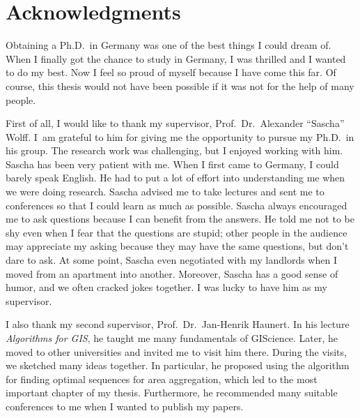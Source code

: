 \section{Acknowledgments}

Obtaining a Ph.D.\ in Germany was 
one of the best things I could dream of.
When I finally got the chance to study in Germany,
I was thrilled and I wanted to do my best.
Now I feel so proud of myself because I have come this far.
Of course, this thesis would not have been possible
if it was not for the help of many people.

First of all, I would like to thank my supervisor, 
Prof.\ Dr.\ Alexander ``Sascha'' Wolff.
I~am grateful to him for giving me 
the opportunity to pursue my Ph.D.\ in his group.
The research work was challenging,
but I enjoyed working with him.
Sascha has been very patient with me.
When I first came to Germany, I could barely speak English.
He had to put a lot of effort into understanding me
when we were doing research.
Sascha advised me to take lectures and sent me to conferences
so that I could learn as much as possible.
Sascha always encouraged me to ask questions
because I can benefit from the answers.
He told me not to be shy even when 
I fear that the questions are stupid;
other people in the audience may appreciate my asking
because they may have the same questions,
but don't dare to ask.
At some point,
Sascha even negotiated with my landlords 
when I moved from an apartment into another.
Moreover, Sascha has a good sense of humor, 
and we often cracked jokes together.
I was lucky to have him as my supervisor.

I also thank my second supervisor, 
Prof.\ Dr.\ Jan-Henrik Haunert.  
In his lecture \emph{Algorithms for GIS}, 
he taught me many fundamentals of GIScience.  
Later, he moved to other universities 
and invited me to visit him there.
During the visits, we sketched many ideas together.
In particular, he proposed %
using the \Astar algorithm 
for finding optimal sequences for area aggregation,
which led to the most important chapter of my thesis.
Furthermore, he recommended many suitable conferences to me
when I wanted to publish my papers.

